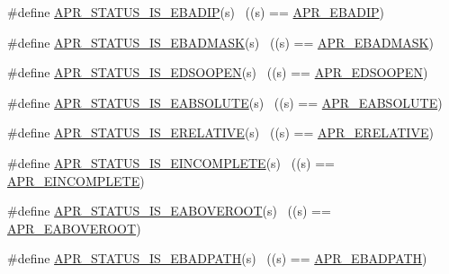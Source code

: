 \begin{DoxyCompactItemize}
\item 
\#define \hyperlink{group___a_p_r___s_t_a_t_u_s___i_s_ga9c1dc9da536956a3f986662e6a69f7a9}{A\+P\+R\+\_\+\+S\+T\+A\+T\+U\+S\+\_\+\+I\+S\+\_\+\+E\+B\+A\+D\+IP}(s)              ~((s) == \hyperlink{group___a_p_r___error_ga96180fb8075ae0150bfed50c2e7f7a59}{A\+P\+R\+\_\+\+E\+B\+A\+D\+IP})
\item 
\#define \hyperlink{group___a_p_r___s_t_a_t_u_s___i_s_gacd72b53b964f32da9d293ae275aac1c0}{A\+P\+R\+\_\+\+S\+T\+A\+T\+U\+S\+\_\+\+I\+S\+\_\+\+E\+B\+A\+D\+M\+A\+SK}(s)          ~((s) == \hyperlink{group___a_p_r___error_ga5249b5edc27466f6b60b3dfa1541ba31}{A\+P\+R\+\_\+\+E\+B\+A\+D\+M\+A\+SK})
\item 
\#define \hyperlink{group___a_p_r___s_t_a_t_u_s___i_s_gacf1ffb7ba19f48116470de6c5c3904a8}{A\+P\+R\+\_\+\+S\+T\+A\+T\+U\+S\+\_\+\+I\+S\+\_\+\+E\+D\+S\+O\+O\+P\+EN}(s)          ~((s) == \hyperlink{group___a_p_r___error_gac96fbde76282364e8c482d6f23bc61bb}{A\+P\+R\+\_\+\+E\+D\+S\+O\+O\+P\+EN})
\item 
\#define \hyperlink{group___a_p_r___s_t_a_t_u_s___i_s_ga6c0f8edb3a9a73037e8d07aa4fade52f}{A\+P\+R\+\_\+\+S\+T\+A\+T\+U\+S\+\_\+\+I\+S\+\_\+\+E\+A\+B\+S\+O\+L\+U\+TE}(s)        ~((s) == \hyperlink{group___a_p_r___error_gafd1ffc5bf2bf215ad048780408913d0e}{A\+P\+R\+\_\+\+E\+A\+B\+S\+O\+L\+U\+TE})
\item 
\#define \hyperlink{group___a_p_r___s_t_a_t_u_s___i_s_gab94e45c2399498c31322d4b28d026ba0}{A\+P\+R\+\_\+\+S\+T\+A\+T\+U\+S\+\_\+\+I\+S\+\_\+\+E\+R\+E\+L\+A\+T\+I\+VE}(s)        ~((s) == \hyperlink{group___a_p_r___error_gae4688dfa866265b9ec3623689c23923b}{A\+P\+R\+\_\+\+E\+R\+E\+L\+A\+T\+I\+VE})
\item 
\#define \hyperlink{group___a_p_r___s_t_a_t_u_s___i_s_gaeac4146f667ea793fae6058516694194}{A\+P\+R\+\_\+\+S\+T\+A\+T\+U\+S\+\_\+\+I\+S\+\_\+\+E\+I\+N\+C\+O\+M\+P\+L\+E\+TE}(s)    ~((s) == \hyperlink{group___a_p_r___error_gab4357bcbdc2922183e0594865b59ce58}{A\+P\+R\+\_\+\+E\+I\+N\+C\+O\+M\+P\+L\+E\+TE})
\item 
\#define \hyperlink{group___a_p_r___s_t_a_t_u_s___i_s_ga641527647de2537c1946a0b2ef07e411}{A\+P\+R\+\_\+\+S\+T\+A\+T\+U\+S\+\_\+\+I\+S\+\_\+\+E\+A\+B\+O\+V\+E\+R\+O\+OT}(s)      ~((s) == \hyperlink{group___a_p_r___error_ga4828cc04f97dc7bed691456adf7c073e}{A\+P\+R\+\_\+\+E\+A\+B\+O\+V\+E\+R\+O\+OT})
\item 
\#define \hyperlink{group___a_p_r___s_t_a_t_u_s___i_s_ga7f8ed6edeab66df4317176d809513032}{A\+P\+R\+\_\+\+S\+T\+A\+T\+U\+S\+\_\+\+I\+S\+\_\+\+E\+B\+A\+D\+P\+A\+TH}(s)          ~((s) == \hyperlink{group___a_p_r___error_ga1731292eb3e3cdc801d3bf0b09cd8da7}{A\+P\+R\+\_\+\+E\+B\+A\+D\+P\+A\+TH})

\end{DoxyCompactItemize}
